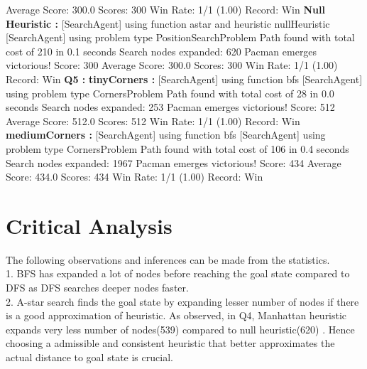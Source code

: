 \documentclass[11pt]{article}
\begin{document}
Average Score: 300.0
Scores:        300
Win Rate:      1/1 (1.00)
Record:        Win
{\bf Null Heuristic :}
[SearchAgent] using function astar and heuristic nullHeuristic
[SearchAgent] using problem type PositionSearchProblem
Path found with total cost of 210 in 0.1 seconds
Search nodes expanded: 620
Pacman emerges victorious! Score: 300
Average Score: 300.0
Scores:        300
Win Rate:      1/1 (1.00)
Record:        Win
{\bf Q5 :}
{\bf tinyCorners :}
[SearchAgent] using function bfs
[SearchAgent] using problem type CornersProblem
Path found with total cost of 28 in 0.0 seconds
Search nodes expanded: 253
Pacman emerges victorious! Score: 512
Average Score: 512.0
Scores:        512
Win Rate:      1/1 (1.00)
Record:        Win
{\bf mediumCorners :}
[SearchAgent] using function bfs
[SearchAgent] using problem type CornersProblem
Path found with total cost of 106 in 0.4 seconds
Search nodes expanded: 1967
Pacman emerges victorious! Score: 434
Average Score: 434.0
Scores:        434
Win Rate:      1/1 (1.00)
Record:        Win
\egroup

\section{Critical Analysis}
The following observations and inferences can be made from the statistics.\\
1. BFS has expanded  a lot  of nodes  before reaching the goal state compared to DFS as DFS searches deeper nodes faster.\\

2. A-star search finds the goal state by expanding lesser number of nodes if there is a good approximation of heuristic. As observed, in Q4,  Manhattan heuristic expands very less number of nodes(539) compared to null heuristic(620) . Hence choosing a admissible and consistent heuristic that better approximates the actual distance to goal state is crucial.
\end{document}
